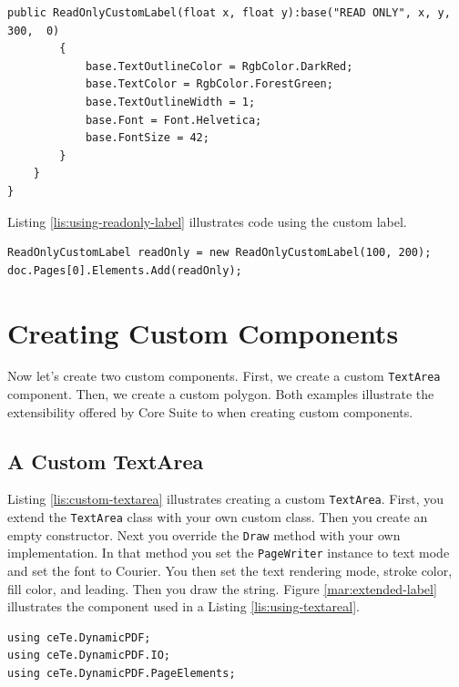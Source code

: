 \documentclass[american,letterpaper]{tufte-book}
\numberwithin{equation}{section}
\numberwithin{figure}{section}
\begin{document}
{{\begin{lstlisting}[caption={A extended label.},label={lis:custom-label},basicstyle={\small\ttfamily},breaklines=true]
        public ReadOnlyCustomLabel(float x, float y):base("READ ONLY", x, y, 300,  0)
        {
            base.TextOutlineColor = RgbColor.DarkRed;
            base.TextColor = RgbColor.ForestGreen;
            base.TextOutlineWidth = 1;
            base.Font = Font.Helvetica;
            base.FontSize = 42;
        }
    }
}
\end{lstlisting}
\leavevmode\egroup

Listing \ref{lis:using-readonly-label} illustrates code using the custom label.

\bgroup{}
\begin{lstlisting}[caption={Using the read-only label.},label={lis:using-readonly-label},basicstyle={\small\ttfamily},breaklines=true]
ReadOnlyCustomLabel readOnly = new ReadOnlyCustomLabel(100, 200);
doc.Pages[0].Elements.Add(readOnly);
\end{lstlisting}
\leavevmode\egroup

\section{Creating Custom Components}

Now let's create two custom components. First, we create a custom \texttt{TextArea} component. Then, we create a custom polygon. Both examples illustrate the extensibility offered by Core Suite to when creating custom components.

\subsection{A Custom TextArea}

Listing \ref{lis:custom-textarea} illustrates creating a custom \texttt{TextArea}. First, you extend the \texttt{TextArea} class with your own custom class. Then you create an empty constructor. Next you override the \texttt{Draw} method with your own implementation. In that method you set the \texttt{PageWriter} instance to text mode and set the font to Courier. You then set the text rendering mode, stroke color, fill color, and leading.  Then you draw the string.  Figure \ref{mar:extended-label} illustrates the component used in a Listing \ref{lis:using-textareal}.
\bgroup{}
\begin{lstlisting}[caption={A custom TextArea.},label={lis:custom-textarea},basicstyle={\small\ttfamily},breaklines=true]
using ceTe.DynamicPDF;
using ceTe.DynamicPDF.IO;
using ceTe.DynamicPDF.PageElements;


\end{lstlisting}}}
\end{document}

